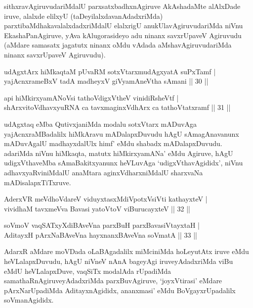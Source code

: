 \begin{artha}
sithxravAgiruvudariMdalU parxsatxbadhxnAgiruve AkAshadaMte alAlxDade iruve, alalxde elilxyU (taDeyilalxdavanAdadxriMda) parxtibaMdhakavalalxdadxriMdalU elalxrigU anukUlavAgiruvudariMda niVnu EkashaPanAgiruve, yAva kAlugorasideyo adu ninanx savxrUpaveV Agiruvudu (aMdare samasatx jagatutx ninanx oMdu vAdada aMshavAgiruvudariMda ninanx savxrUpaveV Agiruvudu).
\end{artha}

\begin{shl}
udAgxtArx hiMkaqtaM pUvaRM sotxVtarxmudAgxyatA suPxTamf | \\
yajAcnxrameBxV tadA madheyxV giVyamAneV\s tha sAmani \hfill|| 30 || 
\end{shl}

\begin{shl}
api hiMkirxyamANoV\s si tathoVdigxVtheV vinidiRsheVtf | \\
shArxvitoV\s dhavxyuRNA ca tavxmaginxVdhArx ca tathoVtatxramf \hfill|| 31 || 
\end{shl}

\begin{artha}
udAgxtaq eMba QutivxjaniMda modalu sotxVtarx mADuvAga yajAcnxraMBadalilx hiMkAravu mADalapxDuvudu hAgU sAmagAnavanunx mADuvAgalU madhayxdalUlx himf' eMdu shabadx mADalapxDuvudu. adariMda niVnu hiMkaqta, matutx hiMkirxyamANa' eMdu Agiruve, hAgU udigxVthaveMba sAmaBakitxyanunx heVLuvAga `udigxVthavAgididx', niVnu adhavxyaRviniMdalU anaMtara aginxVdharxniMdalU sharxvaNa mADisalapxTiTxruve.
\end{artha}


\begin{shl}
AderxVR meVdhoVdareV viduyxtasxMdiVpotxV\s siVti kathayxteV | \\
vividhaM tavxmeVva Bavasi yatoV\s toV viBurucayxteV \hfill|| 32 || 
\end{shl}

\begin{shl}
soVmoV vaqSATxyXdiBAveVna parxBuH parxBavasiVtayxtaH | \\
AditayxH pArxNaBAveVna hayxnanxBAveVna soVmatA \hfill|| 33 || 
\end{shl}

\begin{artha}
AdarxR aMdare moVDada oLaBAgadalilx miMciniMda hoLeyutAtx iruve eMdu heVLalapxDuvudu, hAgU niVneV nAnA bageyAgi iruveyAdadxriMda viBu eMdU heVLalapxDuve, vaqSiTx modalAda rUpadiMda samathaRnAgiruveyAdadxriMda parxBuvAgiruve, `joyxVtirasi' eMdare pArxNarUpadiMda AditayxnAgididx, ananxmasi' eMdu BoVgayxrUpadalilx soVmanAgididx.
\end{artha}

